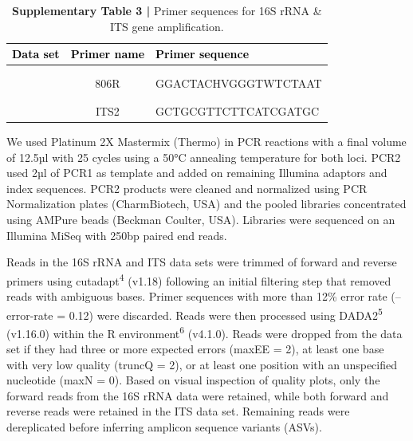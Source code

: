 \documentclass[
  10pt,
  letterpaper,
  DIV=11,
  numbers=noendperiod]{scrartcl}
\begin{document}
\begin{table}[H]

\caption{\textbf{Supplementary Table 3 |} Primer sequences for 16S rRNA \& ITS gene amplification.}
\centering
\fontsize{9}{11}\selectfont
\begin{tabular}[t]{lcl}
\toprule
\textcolor{black}{\textbf{Data set}} & \textcolor{black}{\textbf{Primer name}} & \textcolor{black}{\textbf{Primer sequence}}\\
\midrule
\addlinespace[1em]
\multicolumn{3}{l}{\textbf{16S rRNA}}\\
\hspace{1em}\cellcolor{gray!6}{} & \cellcolor{gray!6}{515F} & \cellcolor{gray!6}{GTGCCAGCMGCCGCGGTAA}\\
\hspace{1em} & 806R & GGACTACHVGGGTWTCTAAT\\
\addlinespace[0.3em]
\multicolumn{3}{l}{\textbf{ITS}}\\
\hspace{1em}\cellcolor{gray!6}{} & \cellcolor{gray!6}{ITS1f} & \cellcolor{gray!6}{CTTGGTCATTTAGAGGAAGTAA}\\
\hspace{1em} & ITS2 & GCTGCGTTCTTCATCGATGC\\
\bottomrule
\end{tabular}
\end{table}

We used Platinum 2X Mastermix (Thermo) in PCR reactions with a final
volume of 12.5µl with 25 cycles using a 50°C annealing temperature for
both loci. PCR2 used 2µl of PCR1 as template and added on remaining
Illumina adaptors and index sequences. PCR2 products were cleaned and
normalized using PCR Normalization plates (CharmBiotech, USA) and the
pooled libraries concentrated using AMPure beads (Beckman Coulter, USA).
Libraries were sequenced on an Illumina MiSeq with 250bp paired end
reads.

Reads in the 16S rRNA and ITS data sets were trimmed of forward and
reverse primers using cutadapt\textsuperscript{4} (v1.18) following an
initial filtering step that removed reads with ambiguous bases. Primer
sequences with more than 12\% error rate (--error-rate = 0.12) were
discarded. Reads were then processed using DADA2\textsuperscript{5}
(v1.16.0) within the R environment\textsuperscript{6} (v4.1.0). Reads
were dropped from the data set if they had three or more expected errors
(maxEE = 2), at least one base with very low quality (truncQ = 2), or at
least one position with an unspecified nucleotide (maxN = 0). Based on
visual inspection of quality plots, only the forward reads from the 16S
rRNA data were retained, while both forward and reverse reads were
retained in the ITS data set. Remaining reads were dereplicated before
inferring amplicon sequence variants (ASVs).
\end{document}
